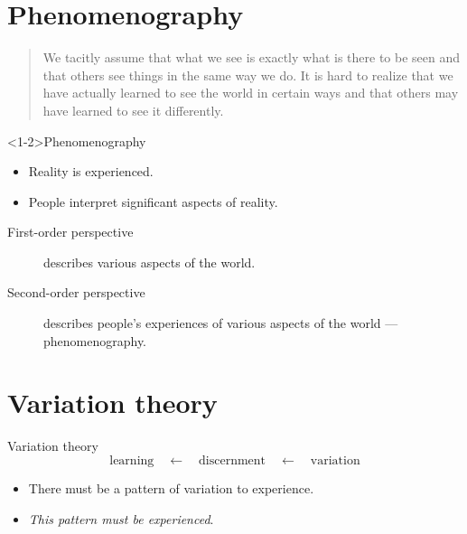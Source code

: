 \section{Phenomenography}

\begin{frame}
  \blockcquote{NecessaryConditionsOfLearning}{%
    We tacitly assume that what we see is exactly what is there to be seen and 
    that others see things in the same way we do. It is hard to realize that we 
    have actually learned to see the world in certain ways and that others may 
    have learned to see it differently.
  }
\end{frame}

\begin{frame}
  \begin{block}<1-2>{Phenomenography~\cite{Phenomenography}}
    \begin{itemize}
      \item Reality is experienced.
      \item People interpret significant aspects of reality.
    \end{itemize}
    \pause
    \begin{description}
      \item[First-order perspective] describes various aspects of the world.
      \item[Second-order perspective] describes people's experiences of various 
        aspects of the world --- phenomenography.
    \end{description}
  \end{block}
\end{frame}

\section{Variation theory}

\begin{frame}
  \begin{block}{Variation theory~\cite{VariationTheory}}
    \vspace{-0.5em}
    \[
      \text{learning}
      \quad\leftarrow\quad
      \text{discernment}
      \quad\leftarrow\quad
      \text{variation}
    \]
  \end{block}

  \pause

  \begin{remark}
    \begin{itemize}
      \item There must be a pattern of variation to experience.
      \item \emph{This pattern must be experienced}.
    \end{itemize}
  \end{remark}
\end{frame}

